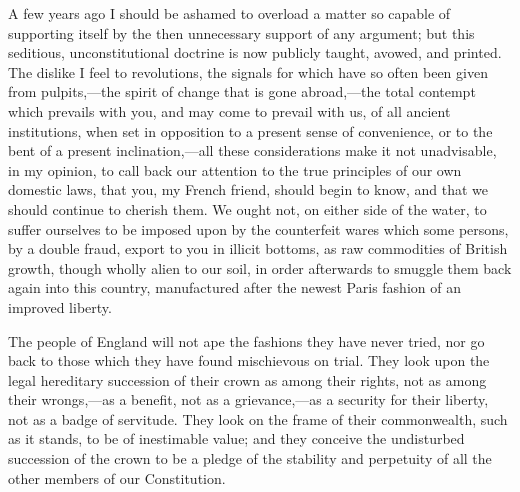 A few years ago I should be ashamed to overload a matter so capable of supporting itself by the then unnecessary support of any argument; but this seditious, unconstitutional doctrine is now publicly taught, avowed, and printed. The dislike I feel to revolutions, the signals for which have so often been given from pulpits,—the spirit of change that is gone abroad,—the total contempt which prevails with you, and may come to prevail with us, of all ancient institutions, when set in opposition to a present sense of convenience, or to the bent of a present inclination,—all these considerations make it not unadvisable, in my opinion, to call back our attention to the true principles of our own domestic laws, that you, my French friend, should begin to know, and that we should continue to cherish them. We ought not, on either side of the water, to suffer ourselves to be imposed upon by the counterfeit wares which some persons, by a double fraud, export to you in illicit bottoms, as raw commodities of British growth, though wholly alien to our soil, in order afterwards to smuggle them back again into this country, manufactured after the newest Paris fashion of an improved liberty.

The people of England will not ape the fashions they have never tried, nor go back to those which they have found mischievous on trial. They look upon the legal hereditary succession of their crown as among their rights, not as among their wrongs,—as a benefit, not as a grievance,—as a security for their liberty, not as a badge of servitude. They look on the frame of their commonwealth, such as it stands, to be of inestimable value; and they conceive the undisturbed succession of the crown to be a pledge of the stability and perpetuity of all the other members of our Constitution.

